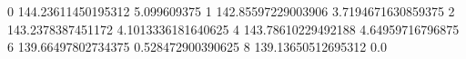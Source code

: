 0 144.23611450195312 5.099609375
1 142.85597229003906 3.7194671630859375
2 143.2378387451172 4.1013336181640625
4 143.78610229492188 4.64959716796875
6 139.66497802734375 0.528472900390625
8 139.13650512695312 0.0
